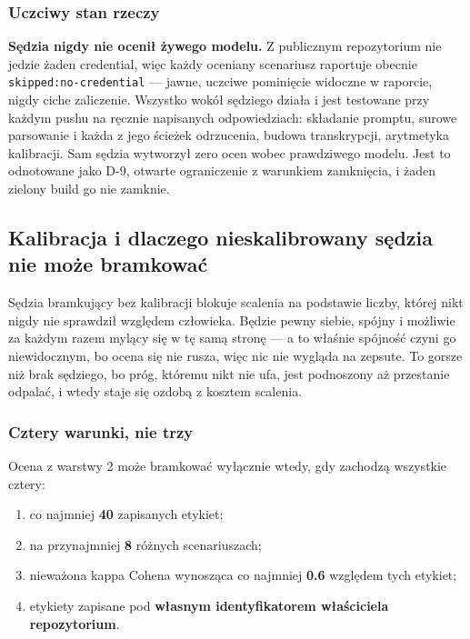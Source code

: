 \documentclass[11pt,a4paper]{article}
\begin{document}
\subsubsection*{Uczciwy stan rzeczy}

\textbf{Sędzia nigdy nie ocenił żywego modelu.} Z publicznym repozytorium nie jedzie żaden credential, więc każdy oceniany scenariusz raportuje obecnie \texttt{skipped:no-credential} --- jawne, uczciwe pominięcie widoczne w raporcie, nigdy ciche zaliczenie. Wszystko wokół sędziego działa i jest testowane przy każdym pushu na ręcznie napisanych odpowiedziach: składanie promptu, surowe parsowanie i każda z jego ścieżek odrzucenia, budowa transkrypcji, arytmetyka kalibracji. Sam sędzia wytworzył zero ocen wobec prawdziwego modelu. Jest to odnotowane jako D-9, otwarte ograniczenie z warunkiem zamknięcia, i żaden zielony build go nie zamknie.

\subsection{Kalibracja i dlaczego nieskalibrowany sędzia nie może bramkować}

Sędzia bramkujący bez kalibracji blokuje scalenia na podstawie liczby, której nikt nigdy nie sprawdził względem człowieka. Będzie pewny siebie, spójny i możliwie za każdym razem mylący się w tę samą stronę --- a to właśnie spójność czyni go niewidocznym, bo ocena się nie rusza, więc nic nie wygląda na zepsute. To gorsze niż brak sędziego, bo próg, któremu nikt nie ufa, jest podnoszony aż przestanie odpalać, i wtedy staje się ozdobą z kosztem scalenia.

\subsubsection*{Cztery warunki, nie trzy}

Ocena z warstwy 2 może bramkować wyłącznie wtedy, gdy zachodzą wszystkie cztery:

\begin{enumerate}[leftmargin=1.6em,itemsep=0.2em]
\item co najmniej \textbf{40} zapisanych etykiet;
\item na przynajmniej \textbf{8} różnych scenariuszach;
\item nieważona kappa Cohena wynosząca co najmniej \textbf{0.6} względem tych etykiet;
\item etykiety zapisane pod \textbf{własnym identyfikatorem właściciela repozytorium}.
\end{enumerate}
\end{document}
